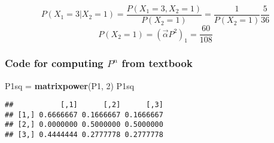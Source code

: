 \documentclass[]{article}
\newenvironment{Shaded}{\begin{snugshade}}{\end{snugshade}}
\newcommand{\CommentTok}[1]{\textcolor[rgb]{0.56,0.35,0.01}{\textit{#1}}}
\newcommand{\ControlFlowTok}[1]{\textcolor[rgb]{0.13,0.29,0.53}{\textbf{#1}}}
\newcommand{\DecValTok}[1]{\textcolor[rgb]{0.00,0.00,0.81}{#1}}
\newcommand{\KeywordTok}[1]{\textcolor[rgb]{0.13,0.29,0.53}{\textbf{#1}}}
\newcommand{\NormalTok}[1]{#1}
\newcommand{\OperatorTok}[1]{\textcolor[rgb]{0.81,0.36,0.00}{\textbf{#1}}}
\newcommand{\StringTok}[1]{\textcolor[rgb]{0.31,0.60,0.02}{#1}}
\begin{document}
\[
P(X_1=3|X_2 = 1) = \frac{P(X_1=3, X_2 =1)}{P(X_2=1)} = \frac{1}{P(X_2=1)} \frac{5}{36}
\] \[
P(X_2=1) = (\vec{\alpha}P^2)_1 = \frac{60}{108}
\]

\hypertarget{code-for-computing-pn-from-textbook}{%
\subsubsection{\texorpdfstring{Code for computing \(P^n\) from
textbook}{Code for computing P\^{}n from textbook}}\label{code-for-computing-pn-from-textbook}}

\begin{Shaded}
\end{Shaded}

\begin{Shaded}
\begin{Highlighting}[]
\NormalTok{P1sq =}\StringTok{ }\KeywordTok{matrixpower}\NormalTok{(P1, }\DecValTok{2}\NormalTok{)}
\NormalTok{P1sq}
\end{Highlighting}
\end{Shaded}

\begin{verbatim}
##           [,1]      [,2]      [,3]
## [1,] 0.6666667 0.1666667 0.1666667
## [2,] 0.0000000 0.5000000 0.5000000
## [3,] 0.4444444 0.2777778 0.2777778
\end{verbatim}
\end{document}
